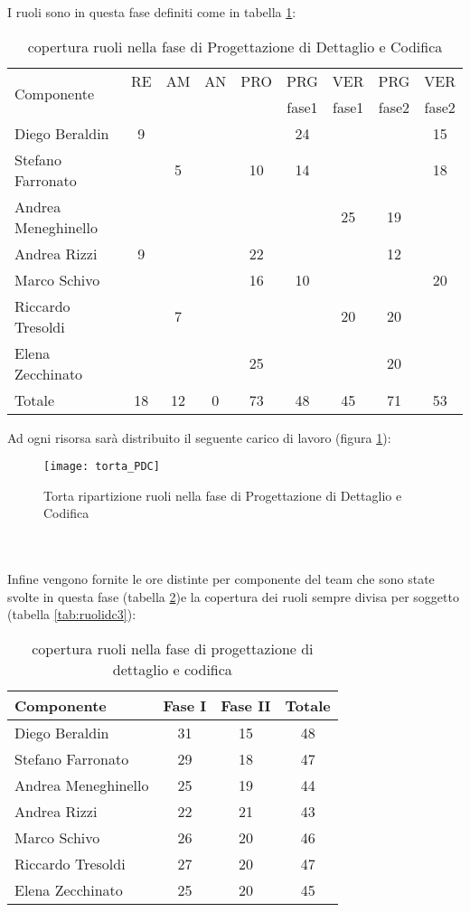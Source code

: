 I ruoli sono in questa fase definiti come in tabella \ref{tab:ruolidc}:\\
\begin{table}[h!]
\centering
\begin{tabular}{|l|c|c|c|c|c|c|c|c|}
\hline
\multirow{2}{*}{Componente}& RE& AM& AN& PRO& PRG&VER& PRG& VER \\
					      &    &     &      &        & fase1&fase1&fase2&fase2\\
\hline
Diego Beraldin & 9& & & & 24& & & 15\\
Stefano Farronato & & 5& & 10&14 & & & 18\\
Andrea Meneghinello & & & & & & 25& 19& \\
Andrea Rizzi & 9& & & 22& & & 12& \\
Marco Schivo & & & & 16& 10& & & 20\\
Riccardo Tresoldi & & 7& & & & 20& 20& \\
Elena Zecchinato & & & & 25& & & 20& \\
\hline
Totale & 18& 12& 0& 73& 48& 45& 71& 53\\
\hline
\end{tabular}
\caption{copertura ruoli nella fase di Progettazione di Dettaglio e Codifica}\label{tab:ruolidc}
\end{table}
\clearpage
Ad ogni risorsa sarà distribuito il seguente carico di lavoro (figura \ref{fig:ruolidc}):\\
\begin{figure}[h!]
\centering
  \texttt{[image: torta\_PDC]}
\caption{Torta ripartizione ruoli nella fase di Progettazione di Dettaglio e Codifica}\label{fig:ruolidc}
\end{figure}
\\\\
Infine vengono fornite le ore distinte per componente del team che sono state svolte in questa fase (tabella \ref{tab:ruolidc2})e la copertura dei ruoli sempre divisa per soggetto (tabella \ref{tab:ruolidc3}):\\
\begin{table}[h]
\centering
\begin{tabular}{|l|c|c|c|}
\hline
Componente& Fase I& Fase II& Totale\\
\hline
Diego Beraldin & 31& 15& 48\\
Stefano Farronato & 29& 18& 47\\
Andrea Meneghinello & 25& 19& 44\\
Andrea Rizzi &22 &21 & 43\\
Marco Schivo & 26& 20& 46\\
Riccardo Tresoldi & 27& 20& 47\\
Elena Zecchinato & 25& 20& 45\\
\hline
\end{tabular}
\caption{copertura ruoli nella fase di progettazione di dettaglio e codifica}\label{tab:ruolidc2}
\end{table}

